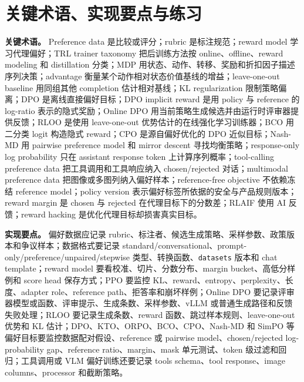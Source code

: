 \documentclass[UTF8,zihao=-4,openany]{ctexbook}
\begin{document}
\section{关键术语、实现要点与练习}
\textbf{关键术语。} Preference data 是比较或评分；rubric 是标注规范；reward model 学习代理偏好；TRL trainer taxonomy 把后训练方法按 online、offline、reward modeling 和 distillation 分类；MDP 用状态、动作、转移、奖励和折扣因子描述序列决策；advantage 衡量某个动作相对状态价值基线的增益；leave-one-out baseline 用同组其他 completion 估计相对基线；KL regularization 限制策略偏离；DPO 是离线直接偏好目标；DPO implicit reward 是用 policy 与 reference 的 log-ratio 表示的隐式奖励；Online DPO 用当前策略生成候选并由运行时评审器提供反馈；RLOO 是使用 leave-one-out 优势估计的在线强化学习训练器；BCO 用二分类 logit 构造隐式 reward；CPO 是源自偏好优化的 DPO 近似目标；Nash-MD 用 pairwise preference model 和 mirror descent 寻找均衡策略；response-only log probability 只在 assistant response token 上计算序列概率；tool-calling preference data 把工具调用和工具响应纳入 chosen/rejected 对话；multimodal preference data 把图像或多图列纳入偏好样本；reference-free objective 不依赖冻结 reference model；policy version 表示偏好标签所依据的安全与产品规则版本；reward margin 是 chosen 与 rejected 在代理目标下的分数差；RLAIF 使用 AI 反馈；reward hacking 是优化代理目标却损害真实目标。

\textbf{实现要点。} 偏好数据应记录 rubric、标注者、候选生成策略、采样参数、政策版本和争议样本；数据格式要记录 standard/conversational、prompt-only/preference/unpaired/stepwise 类型、转换函数、\texttt{datasets} 版本和 chat template；reward model 要看校准、切片、分数分布、margin bucket、高低分样例和 score head 保存方式；PPO 要监控 KL、reward、entropy、perplexity、长度、adapter role、reference path、拒答率和崩坏样例；Online DPO 要记录评审器模型或函数、评审提示、生成条数、采样参数、vLLM 或普通生成路径和反馈失败处理；RLOO 要记录生成条数、reward 函数、跳过样本规则、leave-one-out 优势和 KL 估计；DPO、KTO、ORPO、BCO、CPO、Nash-MD 和 SimPO 等偏好目标要监控数据配对假设、reference 或 pairwise model、chosen/rejected log-probability gap、reference ratio、margin、mask 单元测试、token 级过滤和回归；工具调用或 VLM 偏好训练还要记录 tools schema、tool response、image columns、processor 和截断策略。
\end{document}
